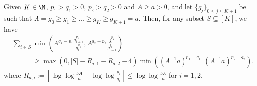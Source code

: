 \begin{lemma}
    \label{lem:accumulated-mixed-descent-lower-bound}
    Given $K \in \N$, $p_1 > q_1 > 0$, $p_2 > q_2 > 0$ and $A \geq a > 0$, and let $\{ g_j \}_{0 \leq j \leq K+1}$ be such that 
    $A = g_0 \geq g_1 \geq \dots \geq g_K \geq g_{K+1} = a$.
    Then, for any subset $S \subseteq [K]$, we have
    \begin{align}
        &\sum_{i \in S}
        \min \left ( 
            A^{q_1 - p_1}\frac{g_{i+1}^{p_1}}{g_{i}^{q_1}},
            A^{q_2 - p_2}\frac{g_{i}^{p_2}}{g_{i-1}^{q_2}} 
        \right )  
        \nonumber
        \\
        &\quad\quad\quad \geq 
        \max(0, |S| - R_{a,1} - R_{a,2} - 4) \min \left ( \left( A^{-1}a \right)^{p_1 - q_1}, \left( A^{-1}a \right)^{p_2 - q_2} \right ).
        \label{eqn:accumulated-mixed-descent-lower-bound}
    \end{align}
    where 
    $R_{a,i} := \left \lfloor \log \log \frac{3A}{a} - \log \log \frac{p_i}{q_i} \right \rfloor \leq \log\log\frac{3A}{a}$ 
    for $i = 1, 2$.
\end{lemma}


